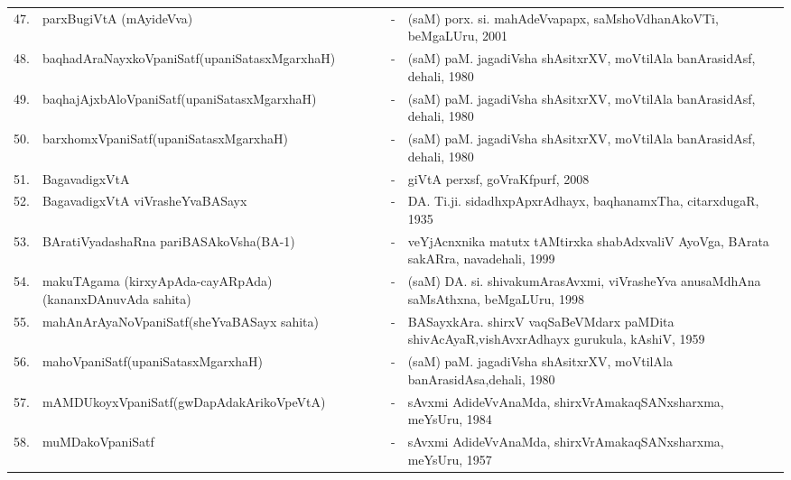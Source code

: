 {\begin{longtable}{rp{6cm}cp{9cm}<{\raggedright}@{}}
47. & parxBugiVtA (mAyideVva) &-& (saM) porx. si. mahAdeVvapapx, saMshoVdhanAkoVTi, beMgaLUru, 2001\\
48. & baqhadAraNayxkoVpaniSatf\newline (upaniSatasxMgarxhaH) &-& (saM) paM. jagadiVsha shAsitxrXV, moVtilAla banArasidAsf, dehali, 1980\\
49. & baqhajAjxbAloVpaniSatf\newline (upaniSatasxMgarxhaH) &-& (saM) paM. jagadiVsha shAsitxrXV, moVtilAla banArasidAsf, dehali, 1980\\
50. & barxhomxVpaniSatf\newline (upaniSatasxMgarxhaH) &-& (saM) paM. jagadiVsha shAsitxrXV, moVtilAla banArasidAsf, dehali, 1980\\
51. & BagavadigxVtA &-& giVtA perxsf, goVraKfpurf, 2008\\
52. & BagavadigxVtA viVrasheYvaBASayx &-& DA. Ti.ji. sidadhxpApxrAdhayx, baqhanamxTha, citarxdugaR, 1935\\
53. & BAratiVyadashaRna pariBASAkoVsha\newline (BA-1) &-& veYjAcnxnika matutx tAMtirxka shabAdxvaliV AyoVga, BArata sakARra, navadehali, 1999\\
54. & makuTAgama (kirxyApAda-cayARpAda)\newline (kananxDAnuvAda sahita) &-& (saM) DA. si. shivakumArasAvxmi, viVrasheYva anusaMdhAna saMsAthxna, beMgaLUru, 1998\\
55. & mahAnArAyaNoVpaniSatf\newline (sheYvaBASayx sahita) &-& BASayxkAra. shirxV vaqSaBeVMdarx paMDita shivAcAyaR,\newline vishAvxrAdhayx gurukula, kAshiV, 1959\\
56. & mahoVpaniSatf\newline (upaniSatasxMgarxhaH) &-& (saM) paM. jagadiVsha shAsitxrXV, moVtilAla banArasidAsa,\newline dehali, 1980\\
57. & mAMDUkoyxVpaniSatf\newline (gwDapAdakArikoVpeVtA) &-& sAvxmi AdideVvAnaMda, shirxVrAmakaqSANxsharxma, meYsUru, 1984\\
58. & muMDakoVpaniSatf &-& sAvxmi AdideVvAnaMda, shirxVrAmakaqSANxsharxma, meYsUru, 1957\\

\end{longtable}}
